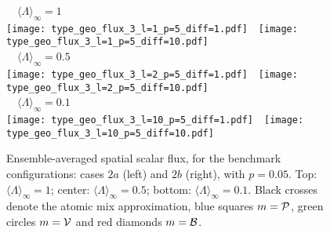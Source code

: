 \documentclass[final,authoryear,5p,times,twocolumn]{elsarticle}
\begin{document}
\begin{figure*}
\begin{center}
\,\,\,\, ${\langle \Lambda \rangle}_{\infty} =1$ \,\,\,\,\\
\texttt{[image: type\_geo\_flux\_3\_l=1\_p=5\_diff=1.pdf]}\,\,\,\,
\texttt{[image: type\_geo\_flux\_3\_l=1\_p=5\_diff=10.pdf]}\\
\,\,\,\, ${\langle \Lambda \rangle}_{\infty} =0.5$ \,\,\,\,\\
\texttt{[image: type\_geo\_flux\_3\_l=2\_p=5\_diff=1.pdf]}\,\,\,\,
\texttt{[image: type\_geo\_flux\_3\_l=2\_p=5\_diff=10.pdf]}\\
\,\,\,\, ${\langle \Lambda \rangle}_{\infty} =0.1$ \,\,\,\,\\
\texttt{[image: type\_geo\_flux\_3\_l=10\_p=5\_diff=1.pdf]}\,\,\,\,
\texttt{[image: type\_geo\_flux\_3\_l=10\_p=5\_diff=10.pdf]}\\
\end{center}
\caption{Ensemble-averaged spatial scalar flux, for the benchmark configurations: cases $2a$ (left) and $2b$ (right), with $p=0.05$. Top: ${\langle \Lambda \rangle}_{\infty}=1$; center: ${\langle \Lambda \rangle}_{\infty}=0.5$; bottom: ${\langle \Lambda \rangle}_{\infty}=0.1$. Black crosses denote the atomic mix approximation, blue squares $m={\cal P}$, green circles $m={\cal V}$ and red diamonds $m={\cal B}$.}
\label{models_3_5}
\end{figure*}
\end{document}
